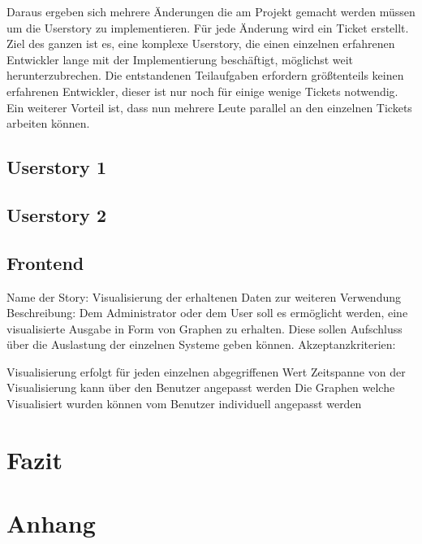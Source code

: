 Daraus ergeben sich mehrere Änderungen die am Projekt gemacht werden müssen um
die Userstory zu implementieren. Für jede Änderung wird ein Ticket erstellt.
Ziel des ganzen ist es, eine komplexe Userstory, die einen einzelnen
erfahrenen Entwickler lange mit der Implementierung beschäftigt, möglichst weit
herunterzubrechen. Die entstandenen Teilaufgaben erfordern größtenteils keinen
erfahrenen Entwickler, dieser ist nur noch für einige wenige Tickets notwendig.
Ein weiterer Vorteil ist, dass nun mehrere Leute parallel an den einzelnen
Tickets arbeiten können.
\tm%

\subsection{Userstory 1}

\subsection{Userstory 2}

\subsection{Frontend}
Name der Story: Visualisierung der erhaltenen Daten zur weiteren Verwendung
Beschreibung: Dem Administrator oder dem User soll es ermöglicht werden, eine
visualisierte Ausgabe in Form von Graphen zu erhalten. Diese sollen Aufschluss
über die Auslastung der einzelnen Systeme geben können.
Akzeptanzkriterien:

\begin{outline}
  \1 Visualisierung erfolgt für jeden einzelnen abgegriffenen Wert
  \1 Zeitspanne von der Visualisierung kann über den Benutzer angepasst werden
  \1 Die Graphen welche Visualisiert wurden können vom Benutzer individuell
  angepasst werden
\end{outline}
\mr%

\section{Fazit}

\newpage

\appendix

\printglossaries%

\printbibliography[heading=bibnumbered]

\section{Anhang}


